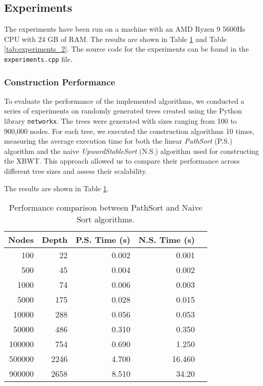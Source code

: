 \subsection{Experiments} 

The experiments have been run on a machine with an AMD Ryzen 9 5600Hs CPU with 24 GB of RAM. The results are shown in Table \cref{tab:experiments} and Table \cref{tab:experiments_2}. The source code for the experiments can be found in the \texttt{experiments.cpp} file.

\subsubsection{Construction Performance}
To evaluate the performance of the implemented algorithms, we conducted a series of experiments on randomly generated trees created using the Python library \texttt{networkx}. The trees were generated with sizes ranging from 100 to 900,000 nodes. For each tree, we executed the construction algorithms 10 times, measuring the average execution time for both the linear \emph{PathSort} (P.S.) algorithm and the naive \emph{UpwardStableSort} (N.S.) algorithm used for constructing the XBWT. This approach allowed us to compare their performance across different tree sizes and assess their scalability.


The results are shown in Table \cref{tab:experiments}.

\begin{table}[h]
    \centering
    \begin{tabular}{|r|r|r|r|r|}
        \hline
        \textbf{Nodes} & \textbf{Depth} & \textbf{P.S. Time (s)} & \textbf{N.S. Time (s)} \\
        \hline
        100 & 22 & 0.002 & 0.001 \\
        500 & 45 & 0.004 & 0.002  \\
        1000 & 74 & 0.006 & 0.003  \\
        5000 & 175 & 0.028 & 0.015 \\
        10000 & 288 & 0.056 & 0.053 \\
        50000 & 486 & 0.310 & 0.350 \\
        100000 & 754 & 0.690 & 1.250\\
        500000 & 2246 & 4.700 & 16.460 \\
        900000 & 2658 & 8.510 & 34.20 \\
        \hline
    \end{tabular}
    \caption{Performance comparison between PathSort  and Naive Sort  algorithms.}
    \label{tab:experiments}
\end{table}

